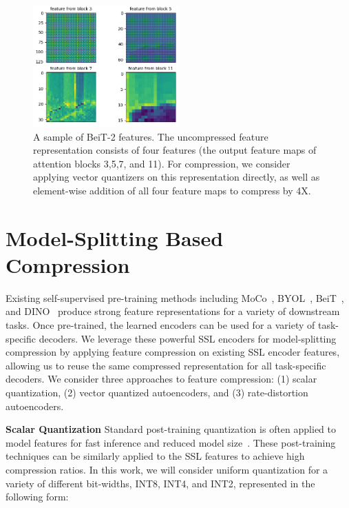\documentclass[10pt,twocolumn,letterpaper]{article}
\begin{document}
\begin{figure}
\begin{center}
\includegraphics[width=0.5\textwidth]{Figures/img0_patch0.png}
\end{center}
\caption{\label{fig:beit-features}%
A sample of BeiT-2 features. The uncompressed feature representation consists of four features (the output feature maps of attention blocks 3,5,7, and 11). For compression, we consider applying vector quantizers on this representation directly, as well as element-wise addition of all four feature maps to compress by 4X.}
\end{figure}

\section{Model-Splitting Based Compression}

Existing self-supervised pre-training methods including MoCo~\cite{chen2021empirical}, BYOL~\cite{grill2020bootstrap}, BeiT~\cite{peng2022beit}, and DINO~\cite{oquab2023dinov2} produce strong feature representations for a variety of downstream tasks. Once pre-trained, the learned encoders can be used for a variety of task-specific decoders. We leverage these powerful SSL encoders for model-splitting compression by applying feature compression on existing SSL encoder features, allowing us to reuse the same compressed representation for all task-specific decoders. We consider three approaches to feature compression: (1) scalar quantization, (2) vector quantized autoencoders, and (3) rate-distortion autoencoders. 

\textbf{Scalar Quantization} Standard post-training quantization is often applied to model features for fast inference and reduced model size~\cite{wu2020integer}. These post-training techniques can be similarly applied to the SSL features to achieve high compression ratios. In this work, we will consider uniform quantization for a variety of different bit-widths, INT8, INT4, and INT2, represented in the following form:
\end{document}
